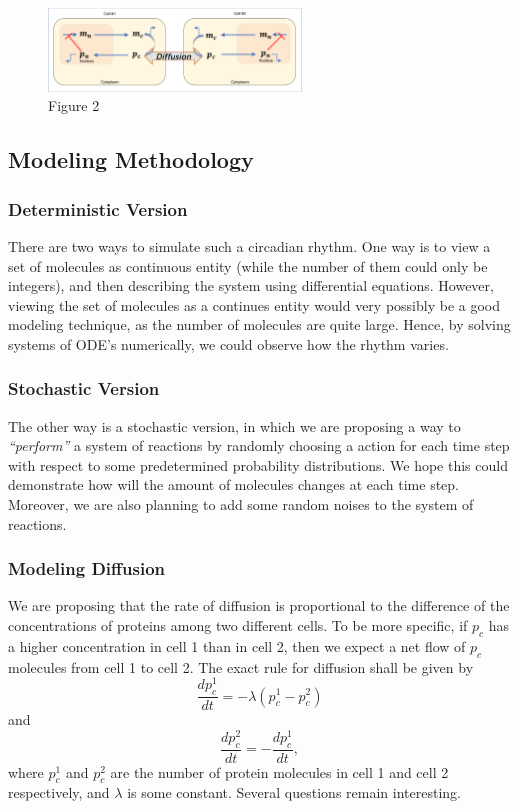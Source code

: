 \documentclass[12pt]{article}
\renewcommand{\(}{\left (}
\renewcommand{\)}{\right )}
\begin{document}
\begin {figure}[t]
	\centering
	\includegraphics[width=0.6\textwidth]{two_cells.png}
	\caption*{\small Figure 2}\label{Fig:nref=1}
\end {figure}

\subsection{Modeling Methodology}

\subsubsection{Deterministic Version}
There are two ways to simulate such a circadian rhythm. One way is to view a set of molecules as continuous entity (while the number of them could only be integers), and then describing the system using differential equations. However, viewing the set of molecules as a continues entity would very possibly be a good modeling technique, as the number of molecules are quite large. Hence, by solving systems of ODE's numerically, we could observe how the rhythm varies.

\subsubsection{Stochastic Version}
The other way is a stochastic version, in which we are proposing a way to \textit{``perform''} a system of reactions by randomly choosing a action for each time step with respect to some predetermined probability distributions. We hope this could demonstrate how will the amount of molecules changes at each time step. Moreover, we are also planning to add some random noises to the system of reactions.

\subsubsection{Modeling Diffusion}
We are proposing that the rate of diffusion is proportional to the difference of the concentrations of proteins among two different cells. To be more specific, if $p_c$ has a higher concentration in cell 1 than in cell 2, then we expect a net flow of $p_c$ molecules from cell 1 to cell 2. The exact rule for diffusion shall be given by
\begin{equation}
	\frac{d {p_c^1}}{dt} = -\lambda ({p_c^1 - p_c^2})
\end{equation}
and \begin{equation}
	\frac{d {p_c^2}}{dt} = -\frac{d {p_c^1}}{dt},
\end{equation}
where $p_c^1$ and $p_c^2$ are the number of protein molecules in cell 1 and cell 2 respectively, and $\lambda$ is some constant. Several questions remain interesting.
\end{document}
